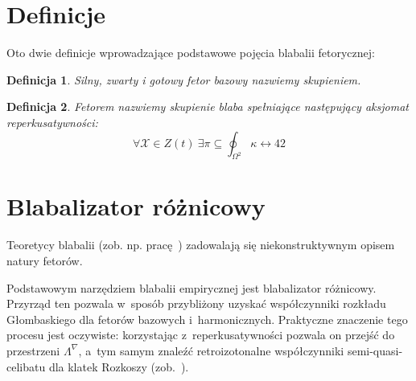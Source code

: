 \documentclass[licencjacka]{pracamgr}
\newtheorem{defi}{Definicja}[section]
\begin{document}
\section{Definicje}

Oto dwie definicje wprowadzające podstawowe pojęcia blabalii
fetorycznej:

\begin{defi}\label{skupienie}
  Silny, zwarty i gotowy fetor bazowy nazwiemy \emph{skupieniem}.
\end{defi}

\begin{defi}\label{fetor}
  \emph{Fetorem} nazwiemy skupienie blaba spełniające następujący
  \emph{aksjomat reperkusatywności}:
  $$\forall \mathcal{X}\in Z(t)\ \exists
  \pi\subseteq\oint_{\Omega^2}\kappa\leftrightarrow 42$$
\end{defi}


\section{Blabalizator różnicowy}

Teoretycy blabalii (zob. np. pracę~\cite{grglo}) zadowalają się
niekonstruktywnym opisem natury fetorów.

Podstawowym narzędziem blabalii empirycznej jest blabalizator
różnicowy.  Przyrząd ten pozwala w~sposób przybliżony uzyskać
współczynniki rozkładu Głombaskiego dla fetorów bazowych
i~harmonicznych.  Praktyczne znaczenie tego procesu jest oczywiste:
korzystając z~reperkusatywności pozwala on przejść do przestrzeni
$\Lambda^{\nabla}$, a~tym samym znaleźć retroizotonalne współczynniki
semi-quasi-celibatu dla klatek Rozkoszy (zob.~\cite{JR}).
\end{document}
